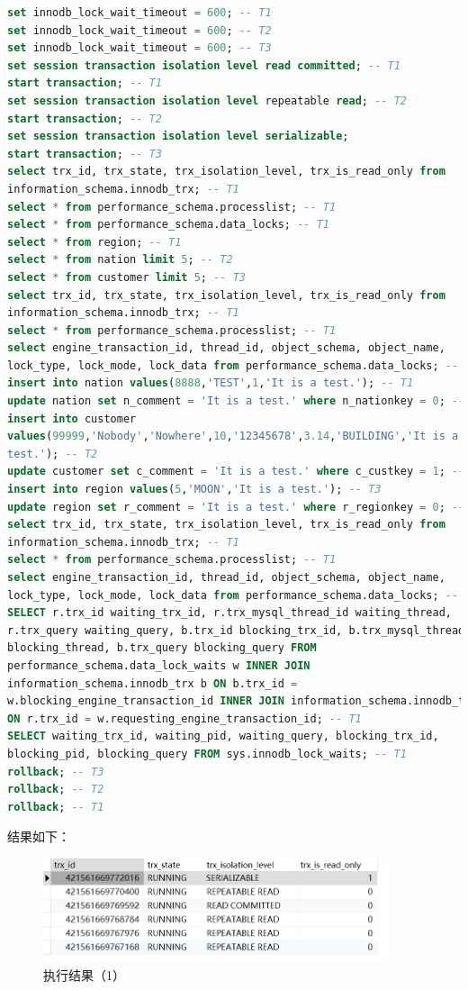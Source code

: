 \documentclass{article}
\begin{document}
\begin{lstlisting}[language=sql]
set innodb_lock_wait_timeout = 600; -- T1
set innodb_lock_wait_timeout = 600; -- T2
set innodb_lock_wait_timeout = 600; -- T3
set session transaction isolation level read committed; -- T1
start transaction; -- T1
set session transaction isolation level repeatable read; -- T2
start transaction; -- T2
set session transaction isolation level serializable;
start transaction; -- T3
select trx_id, trx_state, trx_isolation_level, trx_is_read_only from
information_schema.innodb_trx; -- T1
select * from performance_schema.processlist; -- T1
select * from performance_schema.data_locks; -- T1
select * from region; -- T1
select * from nation limit 5; -- T2
select * from customer limit 5; -- T3
select trx_id, trx_state, trx_isolation_level, trx_is_read_only from
information_schema.innodb_trx; -- T1
select * from performance_schema.processlist; -- T1
select engine_transaction_id, thread_id, object_schema, object_name,
lock_type, lock_mode, lock_data from performance_schema.data_locks; -- T1
insert into nation values(8888,'TEST',1,'It is a test.'); -- T1
update nation set n_comment = 'It is a test.' where n_nationkey = 0; -- T1
insert into customer
values(99999,'Nobody','Nowhere',10,'12345678',3.14,'BUILDING','It is a
test.'); -- T2
update customer set c_comment = 'It is a test.' where c_custkey = 1; -- T2
insert into region values(5,'MOON','It is a test.'); -- T3
update region set r_comment = 'It is a test.' where r_regionkey = 0; -- T3
select trx_id, trx_state, trx_isolation_level, trx_is_read_only from
information_schema.innodb_trx; -- T1
select * from performance_schema.processlist; -- T1
select engine_transaction_id, thread_id, object_schema, object_name,
lock_type, lock_mode, lock_data from performance_schema.data_locks; -- T1
SELECT r.trx_id waiting_trx_id, r.trx_mysql_thread_id waiting_thread,
r.trx_query waiting_query, b.trx_id blocking_trx_id, b.trx_mysql_thread_id
blocking_thread, b.trx_query blocking_query FROM
performance_schema.data_lock_waits w INNER JOIN
information_schema.innodb_trx b ON b.trx_id =
w.blocking_engine_transaction_id INNER JOIN information_schema.innodb_trx r
ON r.trx_id = w.requesting_engine_transaction_id; -- T1
SELECT waiting_trx_id, waiting_pid, waiting_query, blocking_trx_id,
blocking_pid, blocking_query FROM sys.innodb_lock_waits; -- T1
rollback; -- T3
rollback; -- T2
rollback; -- T1
\end{lstlisting}

结果如下：

\begin{figure}[H]
  \centering
  \includegraphics[width=0.9\textwidth]{img/45.png}
  \caption{执行结果（1）}
\end{figure}
\end{document}

